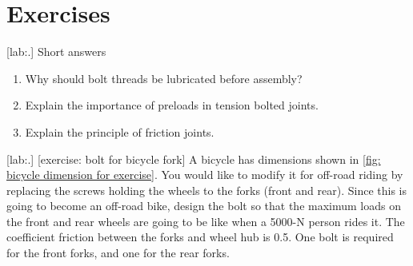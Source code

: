 \documentclass[a4paper,openany,12pt]{book}
\begin{document}
{{\section{Exercises}
\label{exercises-7}
[lab:.] Short answers

\begin{enumerate}
\item Why should bolt threads be lubricated before assembly?

\item Explain the importance of preloads in tension bolted joints.

\item Explain the principle of friction joints.
\end{enumerate}

[lab:.]
[exercise: bolt for bicycle fork] A bicycle has dimensions shown in
\ref{fig: bicycle dimension for exercise}.
You would like to modify it for off-road riding by replacing the screws
holding the wheels to the forks (front and rear). Since this is going to
become an off-road bike, design the bolt so that the maximum loads on
the front and rear wheels are going to be like when a 5000-N person
rides it. The coefficient friction between the forks and wheel hub is
0.5. One bolt is required for the front forks, and one for the rear
forks.


}}
\end{document}
